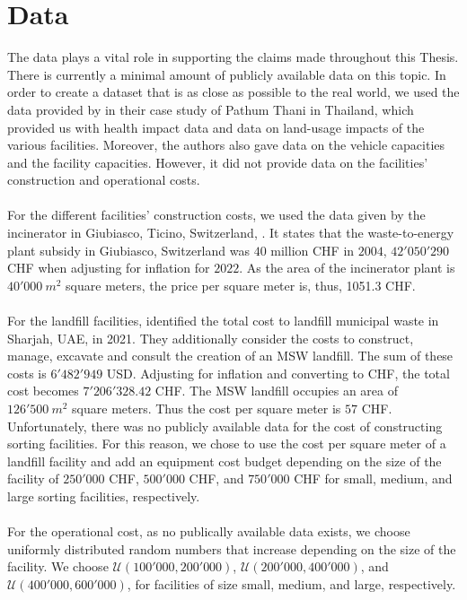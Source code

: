 \documentclass[mscthesis, 11pt]{usiinfthesis}
\theoremstyle{newdefinition}
\begin{document}
\section{Data}
The data plays a vital role in supporting the claims made throughout this Thesis. There is currently a minimal amount of publicly available data on this topic. In order to create a dataset that is as close as possible to the real world, we used the data provided by \cite{olapiriyakul_multiobjective_2019} in their case study of Pathum Thani in Thailand, which provided us with health impact data and data on land-usage impacts of the various facilities. Moreover, the authors also gave data on the vehicle capacities and the facility capacities. However, it did not provide data on the facilities' construction and operational costs. 
\\\\
For the different facilities' construction costs, we used the data given by the incinerator in Giubiasco, Ticino, Switzerland, \cite[~p.~7]{azienda_cantonale_dei_rifiuti_rapporto_nodate}. It states that the waste-to-energy plant subsidy in Giubiasco, Switzerland was $40$ million CHF in $2004$, $42'050'290$ CHF when adjusting for inflation for $2022$. As the area of the incinerator plant is $40'000 \: m^2$ square meters, the price per square meter is, thus, 1051.3 CHF. 
\\\\
For the landfill facilities, \cite{elrabaya_identifying_2021} identified the total cost to landfill municipal waste in Sharjah, UAE, in 2021. They additionally consider the costs to construct, manage, excavate and consult the creation of an MSW landfill. The sum of these costs is $6'482'949$ USD. Adjusting for inflation and converting to CHF, the total cost becomes $7'206'328.42$ CHF. The MSW landfill occupies an area of $126'500 \: m^2$ square meters. Thus the cost per square meter is $57$ CHF. Unfortunately, there was no publicly available data for the cost of constructing sorting facilities. For this reason, we chose to use the cost per square meter of a landfill facility and add an equipment cost budget depending on the size of the facility of $250'000$ CHF, $500'000$ CHF, and $750'000$ CHF for small, medium, and large sorting facilities, respectively.
\\\\
For the operational cost, as no publically available data exists, we choose uniformly distributed random numbers that increase depending on the size of the facility. We choose $\mathcal{U}(100'000, 200'000)$, $\mathcal{U}(200'000, 400'000)$, and $\mathcal{U}(400'000, 600'000)$, for facilities of size small, medium, and large, respectively.
\end{document}
